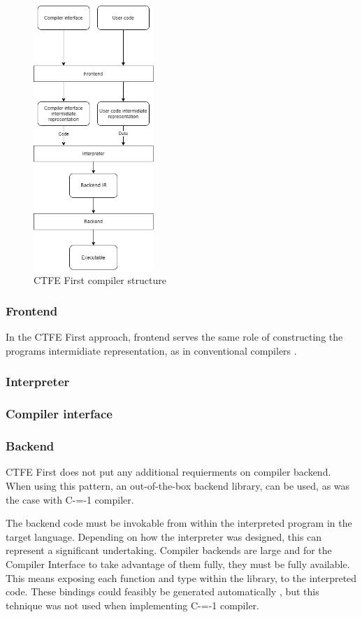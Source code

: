 \begin{figure}
	\includegraphics[height=10cm]{pictures/compiler-structure.png}
	\caption{CTFE First compiler structure}
	\label{CTFE-first-compiler-structure}
\end{figure}

\subsubsection{Frontend}
\label{frontend}

In the CTFE First approach, frontend serves the same role of constructing the programs intermidiate representation, as in conventional compilers \cite{puntambekar:compiler_design}.

\subsubsection{Interpreter}
\label{interpreter}

\subsubsection{Compiler interface} 
\label{compiler-interface}

\subsubsection{Backend}
\label{backend}

CTFE First does not put any additional requierments on compiler backend.
When using this pattern, an out-of-the-box backend library, can be used, as was the case with C-=-1 compiler.

The backend code must be invokable from within the interpreted program in the target language.
Depending on how the interpreter was designed, this can represent a significant undertaking.
Compiler backends are large and for the Compiler Interface to take advantage of them fully, they must be fully available.
This means exposing each function and type within the library, to the interpreted code.
These bindings could feasibly be generated automatically \cite{marshalling_auto_generation}, but this tehnique was not used when implementing C-=-1 compiler.

